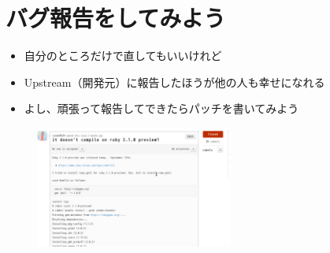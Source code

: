 \section{バグ報告をしてみよう}

\begin{itemize}
\item 自分のところだけで直してもいいけれど
\item Upstream（開発元）に報告したほうが他の人も幸せになれる
\item よし、頑張って報告してできたらパッチを書いてみよう
\end{itemize}

\begin{figure}
  \includegraphics[width=6.5cm]{img/issue180.pdf}
\end{figure}